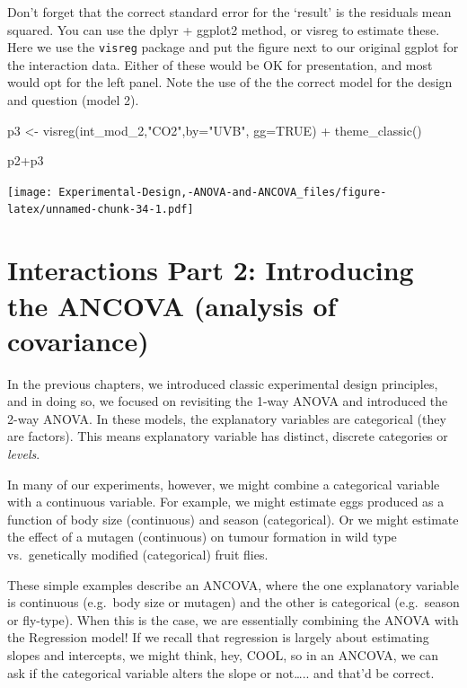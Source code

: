 \documentclass[
]{book}
\newenvironment{Shaded}{\begin{snugshade}}{\end{snugshade}}
\newcommand{\AttributeTok}[1]{\textcolor[rgb]{0.77,0.63,0.00}{#1}}
\newcommand{\ConstantTok}[1]{\textcolor[rgb]{0.00,0.00,0.00}{#1}}
\newcommand{\FunctionTok}[1]{\textcolor[rgb]{0.00,0.00,0.00}{#1}}
\newcommand{\NormalTok}[1]{#1}
\newcommand{\OtherTok}[1]{\textcolor[rgb]{0.56,0.35,0.01}{#1}}
\newcommand{\SpecialCharTok}[1]{\textcolor[rgb]{0.00,0.00,0.00}{#1}}
\newcommand{\StringTok}[1]{\textcolor[rgb]{0.31,0.60,0.02}{#1}}
\begin{document}
Don't forget that the correct standard error for the `result' is the residuals mean squared. You can use the dplyr + ggplot2 method, or visreg to estimate these. Here we use the \texttt{visreg} package and put the figure next to our original ggplot for the interaction data. Either of these would be OK for presentation, and most would opt for the left panel. Note the use of the the correct model for the design and question (model 2).

\begin{Shaded}
\begin{Highlighting}[]
\NormalTok{p3 }\OtherTok{\textless{}{-}} \FunctionTok{visreg}\NormalTok{(int\_mod\_2,}\StringTok{"CO2"}\NormalTok{,}\AttributeTok{by=}\StringTok{"UVB"}\NormalTok{, }\AttributeTok{gg=}\ConstantTok{TRUE}\NormalTok{) }\SpecialCharTok{+}
  \FunctionTok{theme\_classic}\NormalTok{()}

\NormalTok{p2}\SpecialCharTok{+}\NormalTok{p3}
\end{Highlighting}
\end{Shaded}

\texttt{[image: Experimental-Design,-ANOVA-and-ANCOVA\_files/figure-latex/unnamed-chunk-34-1.pdf]}

\hypertarget{interactions-part-2-introducing-the-ancova-analysis-of-covariance}{%
\chapter{Interactions Part 2: Introducing the ANCOVA (analysis of covariance)}\label{interactions-part-2-introducing-the-ancova-analysis-of-covariance}}

In the previous chapters, we introduced classic experimental design principles, and in doing so, we focused on revisiting the 1-way ANOVA and introduced the 2-way ANOVA. In these models, the explanatory variables are categorical (they are factors). This means explanatory variable has distinct, discrete categories or \emph{levels}.

In many of our experiments, however, we might combine a categorical variable with a continuous variable. For example, we might estimate eggs produced as a function of body size (continuous) and season (categorical). Or we might estimate the effect of a mutagen (continuous) on tumour formation in wild type vs.~genetically modified (categorical) fruit flies.

These simple examples describe an ANCOVA, where the one explanatory variable is continuous (e.g.~body size or mutagen) and the other is categorical (e.g.~season or fly-type). When this is the case, we are essentially combining the ANOVA with the Regression model! If we recall that regression is largely about estimating slopes and intercepts, we might think, hey, COOL, so in an ANCOVA, we can ask if the categorical variable alters the slope or not\ldots.. and that'd be correct.
\end{document}
